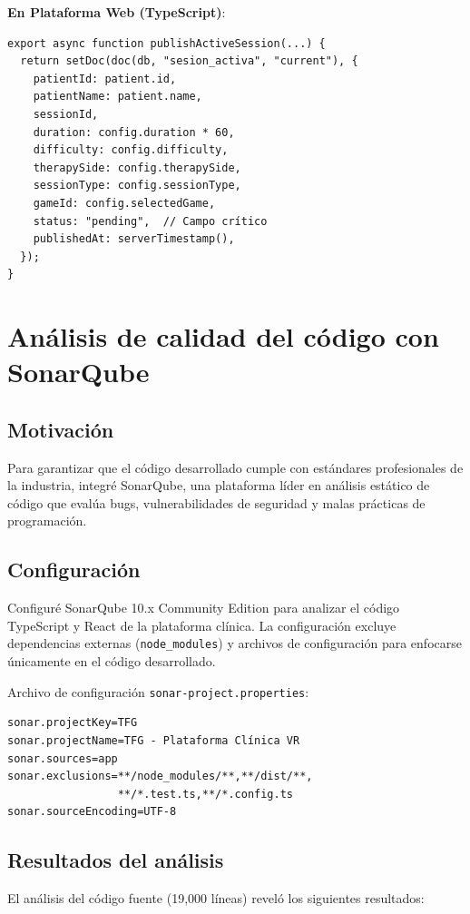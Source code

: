 \textbf{En Plataforma Web (TypeScript)}:
\begin{verbatim}
export async function publishActiveSession(...) {
  return setDoc(doc(db, "sesion_activa", "current"), {
    patientId: patient.id,
    patientName: patient.name,
    sessionId,
    duration: config.duration * 60,
    difficulty: config.difficulty,
    therapySide: config.therapySide,
    sessionType: config.sessionType,
    gameId: config.selectedGame,
    status: "pending",  // Campo crítico
    publishedAt: serverTimestamp(),
  });
}
\end{verbatim}

\section{Análisis de calidad del código con SonarQube}

\subsection{Motivación}

Para garantizar que el código desarrollado cumple con estándares profesionales de la industria, integré SonarQube, una plataforma líder en análisis estático de código que evalúa bugs, vulnerabilidades de seguridad y malas prácticas de programación.

\subsection{Configuración}

Configuré SonarQube 10.x Community Edition para analizar el código TypeScript y React de la plataforma clínica. La configuración excluye dependencias externas (\texttt{node\_modules}) y archivos de configuración para enfocarse únicamente en el código desarrollado.

Archivo de configuración \texttt{sonar-project.properties}:
\begin{verbatim}
sonar.projectKey=TFG
sonar.projectName=TFG - Plataforma Clínica VR
sonar.sources=app
sonar.exclusions=**/node_modules/**,**/dist/**,
                 **/*.test.ts,**/*.config.ts
sonar.sourceEncoding=UTF-8
\end{verbatim}

\subsection{Resultados del análisis}

El análisis del código fuente (19,000 líneas) reveló los siguientes resultados:

